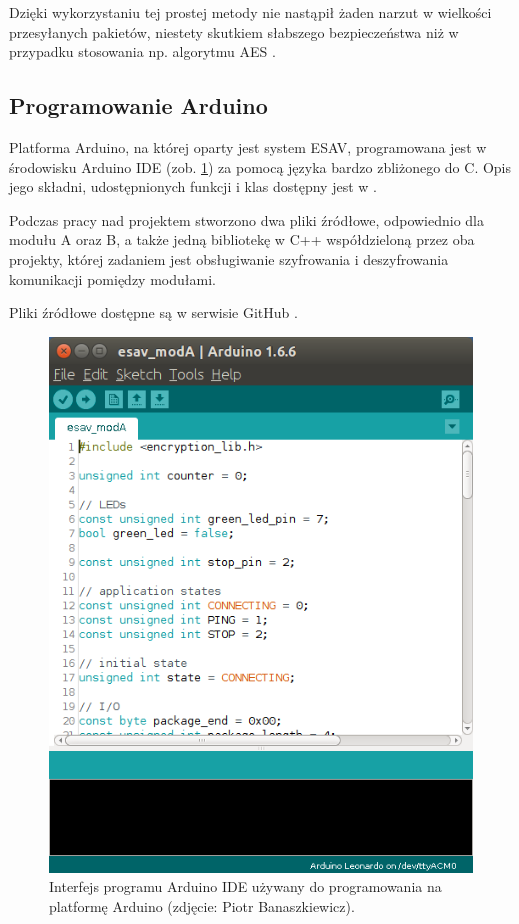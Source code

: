 Dzięki wykorzystaniu tej prostej metody nie nastąpił żaden narzut w wielkości przesyłanych pakietów, niestety skutkiem słabszego bezpieczeństwa niż w przypadku stosowania np. algorytmu AES \cite{AESComment}.

\subsection{Programowanie Arduino}
\label{subsec:programowanie_arduino}

Platforma Arduino, na której oparty jest system ESAV, programowana jest w środowisku Arduino IDE (zob. \ref{fig:arduino_ide}) za pomocą języka bardzo zbliżonego do C. Opis jego składni, udostępnionych funkcji i klas dostępny jest w \cite{ArduinoRef}.

Podczas pracy nad projektem stworzono dwa pliki źródłowe, odpowiednio dla modułu A oraz B, a także jedną bibliotekę w C++ współdzieloną przez oba projekty, której zadaniem jest obsługiwanie szyfrowania i deszyfrowania komunikacji pomiędzy modułami.

Pliki źródłowe dostępne są w serwisie GitHub \cite{CodeSource}.

\begin{figure}[H]
	\centering
	\includegraphics[scale=0.5]{pics/arduino_ide.png}
	\caption{\label{fig:arduino_ide}Interfejs programu Arduino IDE używany do programowania na platformę Arduino (zdjęcie: Piotr Banaszkiewicz).}
\end{figure}

